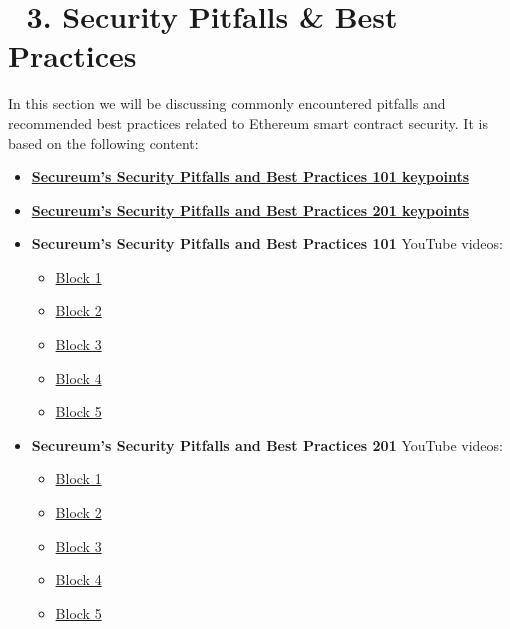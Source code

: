 \chapter{🔏 3. Security Pitfalls \& Best
Practices}\label{security-pitfalls-best-practices}

In this section we will be discussing commonly encountered pitfalls and
recommended best practices related to Ethereum smart contract security.
It is based on the following content:

\begin{itemize}
\tightlist
\item
  \href{https://secureum.substack.com/p/security-pitfalls-and-best-practices-101}{\textbf{Secureum's
  Security Pitfalls and Best Practices 101 keypoints}}
\item
  \href{https://secureum.substack.com/p/security-pitfalls-and-best-practices-201}{\textbf{Secureum's
  Security Pitfalls and Best Practices 201 keypoints}}
\item
  \textbf{Secureum's Security Pitfalls and Best Practices 101} YouTube
  videos:

  \begin{itemize}
  \tightlist
  \item
    \href{https://www.youtube.com/watch?v=OOzyoaYIw2k}{Block 1}
  \item
    \href{https://www.youtube.com/watch?v=fgXuHaZDenU}{Block 2}
  \item
    \href{https://www.youtube.com/watch?v=YVewx1xVROE}{Block 3}
  \item
    \href{https://www.youtube.com/watch?v=byA3MLLiKMM}{Block 4}
  \item
    \href{https://www.youtube.com/watch?v=vyWLO5Dlg50}{Block 5}
  \end{itemize}
\item
  \textbf{Secureum's Security Pitfalls and Best Practices 201} YouTube
  videos:

  \begin{itemize}
  \tightlist
  \item
    \href{https://www.youtube.com/watch?v=WGM1SF8twmw}{Block 1}
  \item
    \href{https://www.youtube.com/watch?v=HqHo1jKUnmU}{Block 2}
  \item
    \href{https://www.youtube.com/watch?v=pXoEIjHupXk}{Block 3}
  \item
    \href{https://www.youtube.com/watch?v=IVbEIbIpWUY}{Block 4}
  \item
    \href{https://www.youtube.com/watch?v=QSsfkmcdbPw}{Block 5}
  \end{itemize}
\end{itemize}
